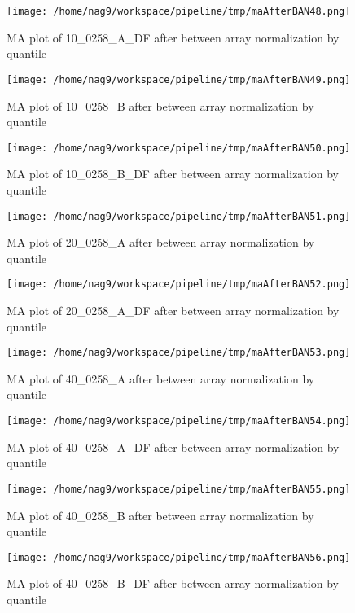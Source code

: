 \documentclass[titlepage]{article}
\begin{document}
\begin{figure}[htb!]
\centering
\texttt{[image: /home/nag9/workspace/pipeline/tmp/maAfterBAN48.png]}
\caption{MA plot of 10\_0258\_A\_DF after between array normalization by quantile}
\end{figure}\pagebreak
\begin{figure}[htb!]
\centering
\texttt{[image: /home/nag9/workspace/pipeline/tmp/maAfterBAN49.png]}
\caption{MA plot of 10\_0258\_B after between array normalization by quantile}
\end{figure}\pagebreak
\begin{figure}[htb!]
\centering
\texttt{[image: /home/nag9/workspace/pipeline/tmp/maAfterBAN50.png]}
\caption{MA plot of 10\_0258\_B\_DF after between array normalization by quantile}
\end{figure}\pagebreak
\begin{figure}[htb!]
\centering
\texttt{[image: /home/nag9/workspace/pipeline/tmp/maAfterBAN51.png]}
\caption{MA plot of 20\_0258\_A after between array normalization by quantile}
\end{figure}\pagebreak
\begin{figure}[htb!]
\centering
\texttt{[image: /home/nag9/workspace/pipeline/tmp/maAfterBAN52.png]}
\caption{MA plot of 20\_0258\_A\_DF after between array normalization by quantile}
\end{figure}\pagebreak
\begin{figure}[htb!]
\centering
\texttt{[image: /home/nag9/workspace/pipeline/tmp/maAfterBAN53.png]}
\caption{MA plot of 40\_0258\_A after between array normalization by quantile}
\end{figure}\pagebreak
\begin{figure}[htb!]
\centering
\texttt{[image: /home/nag9/workspace/pipeline/tmp/maAfterBAN54.png]}
\caption{MA plot of 40\_0258\_A\_DF after between array normalization by quantile}
\end{figure}\pagebreak
\begin{figure}[htb!]
\centering
\texttt{[image: /home/nag9/workspace/pipeline/tmp/maAfterBAN55.png]}
\caption{MA plot of 40\_0258\_B after between array normalization by quantile}
\end{figure}\pagebreak
\begin{figure}[htb!]
\centering
\texttt{[image: /home/nag9/workspace/pipeline/tmp/maAfterBAN56.png]}
\caption{MA plot of 40\_0258\_B\_DF after between array normalization by quantile}
\end{figure}\pagebreak
\end{document}
